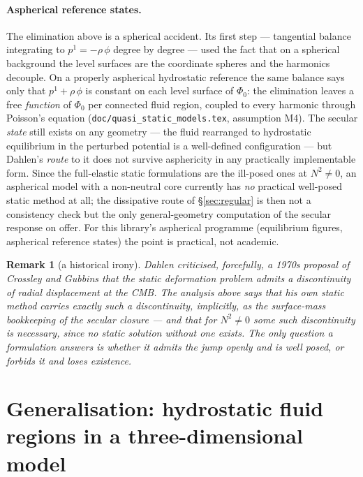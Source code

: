 \documentclass[11pt]{article}
\newtheorem{remark}{Remark}
\newcommand{\code}[1]{\texttt{#1}}
\begin{document}
\paragraph{Aspherical reference states.} The elimination above is a
spherical accident. Its first step --- tangential balance integrating
to $p^1 = -\rho\,\phi$ degree by degree --- used the fact that on a
spherical background the level surfaces are the coordinate spheres
and the harmonics decouple. On a properly aspherical hydrostatic
reference the same balance says only that $p^1 + \rho\,\phi$ is
constant on each level surface of $\Phi_0$: the elimination leaves a
free \emph{function} of $\Phi_0$ per connected fluid region,
coupled to every harmonic through Poisson's equation
(\code{doc/quasi\_static\_models.tex}, assumption M4). The secular
\emph{state} still exists on any geometry --- the fluid rearranged
to hydrostatic equilibrium in the perturbed potential is a
well-defined configuration --- but Dahlen's \emph{route} to it does
not survive asphericity in any practically implementable form. Since
the full-elastic static formulations are the ill-posed ones at
$N^2 \ne 0$, an aspherical model with a non-neutral core currently
has \emph{no} practical well-posed static method at all; the
dissipative route of \S\ref{sec:regular} is then not a consistency
check but the only general-geometry computation of the secular
response on offer. For this library's aspherical programme
(equilibrium figures, aspherical reference states) the point is
practical, not academic.

\begin{remark}[a historical irony]
Dahlen criticised, forcefully, a 1970s proposal of Crossley and
Gubbins that the static deformation problem admits a discontinuity of
radial displacement at the CMB. The analysis above says that his own
static method carries exactly such a discontinuity, implicitly, as
the surface-mass bookkeeping of the secular closure --- and that for
$N^2 \ne 0$ some such discontinuity is \emph{necessary}, since no
static solution without one exists. The only question a formulation
answers is whether it admits the jump openly and is well posed, or
forbids it and loses existence.
\end{remark}

\section[Generalisation: hydrostatic fluid regions in a three-dimensional model]{Generalisation: hydrostatic fluid regions\newline
in a three-dimensional model}
\label{sec:general}
\end{document}
